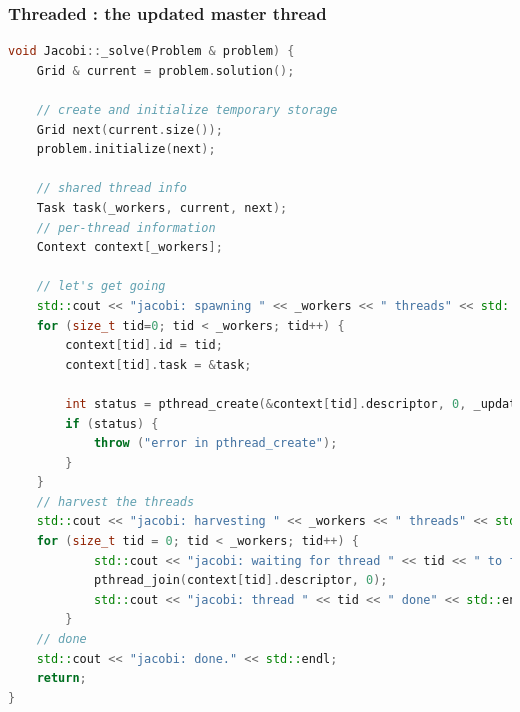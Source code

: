 \begin{frame}[fragile]
% 
  \frametitle{Threaded : the updated master thread}
%
  \begin{lstlisting}[language=c++,name=Jacobi:updated-threaded,basicstyle=\tt\bfseries\tiny]
void Jacobi::_solve(Problem & problem) {
    Grid & current = problem.solution();

    // create and initialize temporary storage
    Grid next(current.size());
    problem.initialize(next);

    // shared thread info
    Task task(_workers, current, next);
    // per-thread information
    Context context[_workers];

    // let's get going
    std::cout << "jacobi: spawning " << _workers << " threads" << std::endl;
    for (size_t tid=0; tid < _workers; tid++) {
        context[tid].id = tid;
        context[tid].task = &task;
        
        int status = pthread_create(&context[tid].descriptor, 0, _update, &context[tid]);
        if (status) {
            throw ("error in pthread_create");
        }
    }
    // harvest the threads
    std::cout << "jacobi: harvesting " << _workers << " threads" << std::endl;
    for (size_t tid = 0; tid < _workers; tid++) {
            std::cout << "jacobi: waiting for thread " << tid << " to finish" << std::endl;
            pthread_join(context[tid].descriptor, 0);
            std::cout << "jacobi: thread " << tid << " done" << std::endl;
        }
    // done
    std::cout << "jacobi: done." << std::endl;
    return;
}
  \end{lstlisting}
%
\end{frame}


